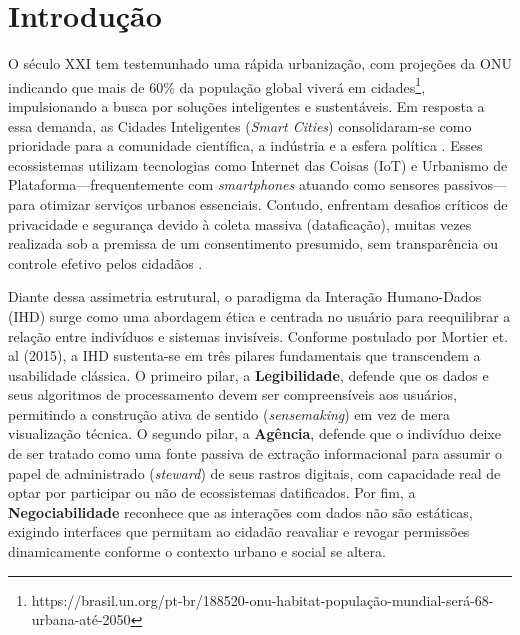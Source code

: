 \documentclass[12pt]{article}
\begin{document}
\section{Introdução}

    O século XXI tem testemunhado uma rápida urbanização, com projeções da ONU indicando que mais de 60\% da população global viverá em cidades\footnote{https://brasil.un.org/pt-br/188520-onu-habitat-população-mundial-será-68-urbana-até-2050}, impulsionando a busca por soluções inteligentes e sustentáveis. Em resposta a essa demanda, as Cidades Inteligentes (\textit{Smart Cities}) consolidaram-se como prioridade para a comunidade científica, a indústria e a esfera política \cite{EREMIA2017}. Esses ecossistemas utilizam tecnologias como Internet das Coisas (IoT) e Urbanismo de Plataforma—frequentemente com \textit{smartphones} atuando como sensores passivos—para otimizar serviços urbanos essenciais. Contudo, enfrentam desafios críticos de privacidade e segurança devido à coleta massiva (dataficação), muitas vezes realizada sob a premissa de um consentimento presumido, sem transparência ou controle efetivo pelos cidadãos \cite{streitz2019beyond}. 

   Diante dessa assimetria estrutural, o paradigma da Interação Humano-Dados (IHD) surge como uma abordagem ética e centrada no usuário para reequilibrar a relação entre indivíduos e sistemas invisíveis. Conforme postulado por Mortier et. al (2015\nocite{mortier2015humandatainteractionhumanface}), a IHD sustenta-se em três pilares fundamentais que transcendem a usabilidade clássica. O primeiro pilar, a \textbf{Legibilidade}, defende que os dados e seus algoritmos de processamento devem ser compreensíveis aos usuários, permitindo a construção ativa de sentido (\textit{sensemaking}) em vez de mera visualização técnica. O segundo pilar, a \textbf{Agência}, defende que o indivíduo deixe de ser tratado como uma fonte passiva de extração informacional para assumir o papel de administrado (\textit{steward}) de seus rastros digitais, com capacidade real de optar por participar ou não de ecossistemas datificados. Por fim, a \textbf{Negociabilidade} reconhece que as interações com dados não são estáticas, exigindo interfaces que permitam ao cidadão reavaliar e revogar permissões dinamicamente conforme o contexto urbano e social se altera.
\end{document}
